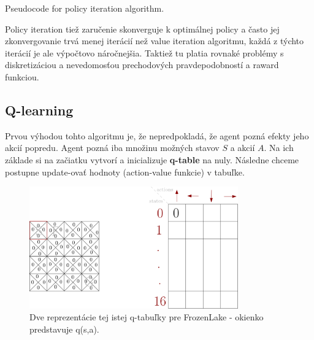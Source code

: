 \documentclass[letterpaper,12pt]{article}
\begin{document}
\vspace{0.3cm}
\begin{algorithm}[H]
\noindent{}
\vspace{0.4cm}
\caption{Pseudocode for policy iteration algorithm.}
\end{algorithm}
\vspace{0.3cm}

Policy iteration tiež zaručenie skonverguje k optimálnej policy a často jej zkonvergovanie trvá menej iterácií než value iteration algoritmu, každá z týchto iterácií je ale výpočtovo náročnejšia. Taktiež tu platia rovnaké problémy s diskretizáciou a nevedomosťou prechodových pravdepodobností a raward funkciou.


\subsection{Q-learning}

Prvou výhodou tohto algoritmu je, že nepredpokladá, že agent pozná efekty jeho akcií popredu. Agent pozná iba množinu možných stavov $S$ a akcií $A$. Na ich základe si na začiatku vytvorí a inicializuje \textbf{q-table} na nuly. Následne chceme postupne update-ovať hodnoty (action-value funkcie) v tabuľke. 

\begin{figure}[H]
\centering
\includegraphics[width=9cm]{images/qtable.png}
\caption{Dve reprezentácie tej istej q-tabuľky pre FrozenLake - okienko predstavuje q(s,a).}
\end{figure}
\end{document}
